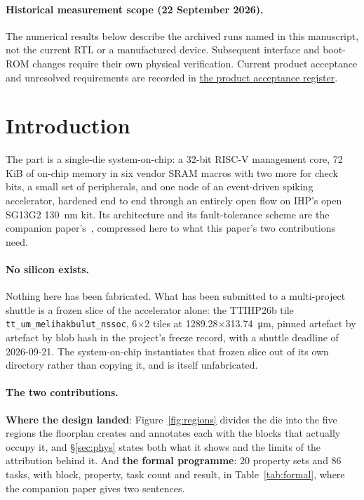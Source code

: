\documentclass[11pt,a4paper]{article}
\newcommand{\file}[1]{\texttt{\small #1}}
\begin{document}
\paragraph{Historical measurement scope (22 September 2026).}
The numerical results below describe the archived runs named in this
manuscript, not the current RTL or a manufactured device. Subsequent
interface and boot-ROM changes require their own physical verification.
Current product acceptance and unresolved requirements are recorded in
\href{https://github.com/Melihakbulut221/nssoc/blob/codex/complete-open-work/docs/92-product-acceptance.md}{the product acceptance register}.


\section{Introduction}
\label{sec:intro}

The part is a single-die system-on-chip: a \num{32}-bit RISC-V
management core, \num{72}\,KiB of on-chip memory in six vendor SRAM
macros with two more for check bits, a small set of peripherals, and one node of an event-driven
spiking accelerator, hardened end to end through an entirely open flow
on IHP's open SG13G2 \SI{130}{\nano\meter} kit. Its architecture and
its fault-tolerance scheme are the companion
paper's~\cite{companion_design}, compressed here to what this paper's
two contributions need.

\paragraph{No silicon exists.} Nothing here has been fabricated. What
has been submitted to a multi-project shuttle is a frozen slice of the
accelerator alone: the TTIHP26b tile
\file{tt\_um\_\allowbreak melihakbulut\_\allowbreak nssoc},
\num{6}$\times$\num{2} tiles at
\SI{1289.28}{}$\times$\SI{313.74}{\um}, pinned artefact by
artefact by blob hash in the project's freeze record, with a shuttle
deadline of 2026-09-21. The system-on-chip instantiates that frozen
slice out of its own directory rather than copying it, and is itself
unfabricated.

\paragraph{The two contributions.} \textbf{Where the design landed}:
Figure~\ref{fig:regions} divides the die into the five regions the
floorplan creates and annotates each with the blocks that actually
occupy it, and \S\ref{sec:phys} states both what it shows and the
limits of the attribution behind it. And \textbf{the formal programme}:
\num{20} property sets and \num{86} tasks, with block, property, task
count and result, in Table~\ref{tab:formal}, where the companion paper
gives two sentences.
\end{document}
